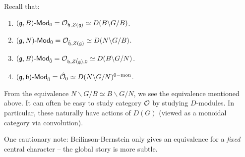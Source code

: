 \documentclass{article}
\begin{document}
Recall that:
\begin{enumerate}
	\item $(\mathfrak{g}, B)\text{-}\mathsf{Mod}_0 = \mathcal{O}_{\mathfrak{h},Z(\mathfrak{g})} \simeq D(B \backslash G / B)$.
	\item $(\mathfrak{g}, N)\text{-}\mathsf{Mod}_0 = \mathcal{O}_{\hat{\mathfrak{h}},Z(\mathfrak{g})} \simeq D(N \backslash G / B)$.
	\item $(\mathfrak{g}, B)\text{-}\mathsf{Mod}_{\hat{0}} = \mathcal{O}_{\mathfrak{h},\hat{Z(\mathfrak{g})},0} \simeq D(B \backslash G / N)$.
	\item $(\mathfrak{g}, \mathfrak{b})\text{-}\mathsf{Mod}_{\hat{0}} = \hat{\mathcal{O}}_0 \simeq D(N \backslash G / N)^{0\mathrm{-mon}}$.
\end{enumerate}

From the equivalence $N \backslash G / B \simeq B \backslash G / N$, we see the equivalence mentioned above.
It can often be easy to study category $\mathcal{O}$ by studying $D$-modules.
In particular, these naturally have actions of $D(G)$ (viewed as a monoidal category via convolution).

One cautionary note: Beilinson-Bernstein only gives an equivalence for a \emph{fixed} central character -- the global story is more subtle.
\end{document}
